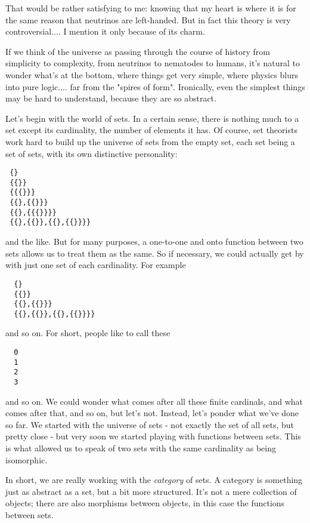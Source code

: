 That would be rather satisfying to me: knowing that my heart is where it
is for the same reason that neutrinos are left-handed.  But in fact this
theory is very controversial.... I mention it only because of its charm.


If we think of the universe as passing through the course of history
from simplicity to complexity, from neutrinos to nematodes to humans,
it's natural to wonder what's at the bottom, where things get very
simple, where physics blurs into pure logic.... far from the "spires of
form".  Ironically, even the simplest things may be hard to understand, 
because they are so abstract.  

Let's begin with the world of sets.  In a certain sense, there is
nothing much to a set except its cardinality, the number of elements it
has.  Of course, set theorists work hard to build up the universe of
sets from the empty set, each set being a set of sets, with its own
distinctive personality:

\begin{verbatim}
 {}
 {{}}
 {{{}}}
 {{},{{}}}
 {{},{{{}}}}
 {{},{{}},{{},{{}}}}

\end{verbatim}
    
and the like.  But for many purposes, a one-to-one and onto function
between two sets allows us to treat them as the same.  So if necessary,
we could actually get by with just one set of each cardinality.  For
example 

\begin{verbatim}
  {}
  {{}}
  {{},{{}}}
  {{},{{}},{{},{{}}}}

\end{verbatim}
    
and so on.  For short, people like to call these

\begin{verbatim}
  0
  1
  2
  3

\end{verbatim}
    
and so on.  We could wonder what comes after all these finite cardinals,
and what comes after that, and so on, but let's not.  Instead, let's
ponder what we've done so far.  We started with the universe of sets -
not exactly the set of all sets, but pretty close - but very soon we
started playing with functions between sets.  This is what allowed us to
speak of two sets with the same cardinality as being isomorphic.

In short, we are really working with the \emph{category} of sets.  A category
is something just as abstract as a set, but a bit more structured.  
It's not a mere collection of objects; there are also morphisms between
objects, in this case the functions between sets.  

